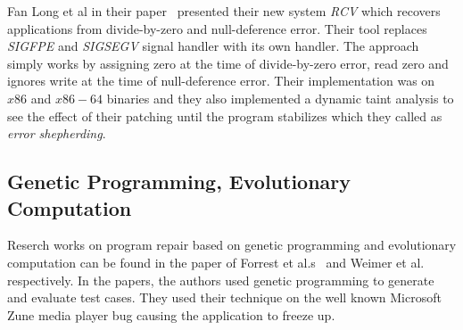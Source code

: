 Fan Long et al in their paper~\cite{conf/pldi/LongSR14} presented their new
system \emph{RCV} which recovers applications from divide-by-zero and
null-deference error. Their tool replaces \emph{SIGFPE} and \emph{SIGSEGV}
signal handler with its own handler. The approach simply works by assigning zero
at the time of divide-by-zero error, read zero and ignores write at the time of
null-deference error. Their implementation was on $x86$ and $x86-64$ binaries
and they also implemented a dynamic taint analysis to see the effect of
their
patching until the program stabilizes which they called as \emph{error
shepherding}.

\subsection{Genetic Programming, Evolutionary Computation}
\label{subsec:RecWorksGeneric}

Reserch works on program repair based on genetic programming and evolutionary
computation can be found in the paper of Forrest
et al.s~\cite{conf/gecco/2009g} and Weimer
et al.~\cite{DBLP:journals/cacm/WeimerFGN10} respectively. In the papers, the
authors used genetic programming to generate and evaluate test cases. They used their
technique on the well known Microsoft Zune media player bug causing the
application to freeze up.


